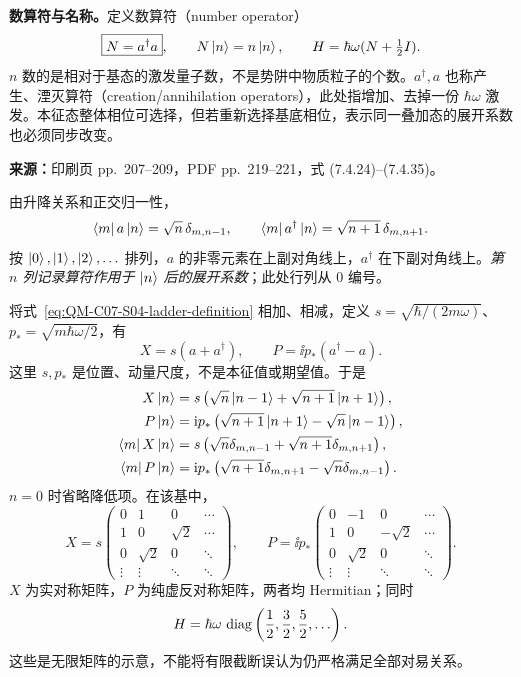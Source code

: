 \textbf{数算符与名称。}定义数算符（number operator）
\begin{equation}
  \boxed{N=a^\dagger a},\qquad N\left|n\right\rangle=n\left|n\right\rangle,
  \qquad H=\hbar\omega(N+\tfrac12I).
\end{equation}
$n$ 数的是相对于基态的激发量子数，不是势阱中物质粒子的个数。$a^\dagger,a$ 也称产生、湮灭算符（creation/annihilation operators），此处指增加、去掉一份 $\hbar\omega$ 激发。本征态整体相位可选择，但若重新选择基底相位，表示同一叠加态的展开系数也必须同步改变。

\textbf{来源：}印刷页 pp.~207--209，PDF pp.~219--221，式 (7.4.24)--(7.4.35)。

由升降关系和正交归一性，
\begin{equation}
  \left\langle m\right| a\left|n\right\rangle=\sqrt n\,\delta_{m,n-1},\qquad
  \left\langle m\right| a^\dagger\left|n\right\rangle=\sqrt{n+1}\,\delta_{m,n+1}.
\end{equation}
按 $\left|0\right\rangle,\left|1\right\rangle,\left|2\right\rangle,\ldots$ 排列，$a$ 的非零元素在上副对角线上，$a^\dagger$ 在下副对角线上。\emph{第 $n$ 列记录算符作用于 $\left|n\right\rangle$ 后的展开系数}；此处行列从 $0$ 编号。

将式~\eqref{eq:QM-C07-S04-ladder-definition} 相加、相减，定义
$s=\sqrt{\hbar/(2m\omega)}$、$p_*=\sqrt{m\hbar\omega/2}$，有
\begin{equation}
  \boxed{X=s(a+a^\dagger)},\qquad
  \boxed{P=\ii p_*(a^\dagger-a)}.
\end{equation}
这里 $s,p_*$ 是位置、动量尺度，不是本征值或期望值。于是
\begin{align}
  X\left|n\right\rangle&=s\left(\sqrt n\left|n-1\right\rangle+\sqrt{n+1}\left|n+1\right\rangle\right),\\
  P\left|n\right\rangle&=\mathrm{i} p_*\left(\sqrt{n+1}\left|n+1\right\rangle-\sqrt n\left|n-1\right\rangle\right),\\
  \left\langle m\right| X\left|n\right\rangle&=s\left(\sqrt n\delta_{m,n-1}+\sqrt{n+1}\delta_{m,n+1}\right),\\
  \left\langle m\right| P\left|n\right\rangle&=\mathrm{i} p_*\left(\sqrt{n+1}\delta_{m,n+1}-\sqrt n\delta_{m,n-1}\right).
  \label{eq:QM-C07-S04-xp-elements}
\end{align}
$n=0$ 时省略降低项。在该基中，
\begin{equation}
  X=s\begin{pmatrix}
  0&1&0&\cdots\\1&0&\sqrt2&\cdots\\
  0&\sqrt2&0&\ddots\\\vdots&\vdots&\ddots&\ddots
  \end{pmatrix},\qquad
  P=\ii p_*\begin{pmatrix}
  0&-1&0&\cdots\\1&0&-\sqrt2&\cdots\\
  0&\sqrt2&0&\ddots\\\vdots&\vdots&\ddots&\ddots
  \end{pmatrix}.
\end{equation}
$X$ 为实对称矩阵，$P$ 为纯虚反对称矩阵，两者均 Hermitian；同时
\begin{equation}
  H=\hbar\omega\,\operatorname{diag}\left(\frac12,\frac32,\frac52,\ldots\right).
\end{equation}
这些是无限矩阵的示意，不能将有限截断误认为仍严格满足全部对易关系。

